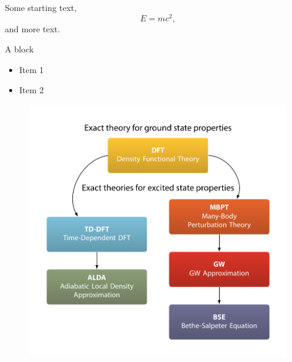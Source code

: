 \documentclass{beamer}
\begin{document}
\begin{frame}
Some starting text,
\begin{equation}
E = mc^{2},
\end{equation}
and more text.
\begin{block}{A block}
\begin{itemize}
\item Item 1
\item Item 2
\end{itemize}
\end{block}
\end{frame}

\begin{frame}
\begin{figure}
\centering
\includegraphics[height=\textheight]{diag-methods}
\end{figure}
\end{frame}
\end{document}

